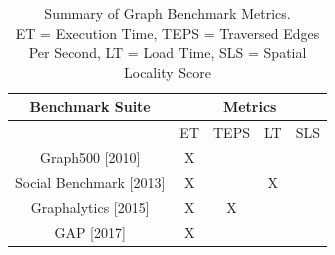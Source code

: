\documentclass[letterpaper, 10pt]{article}
\begin{document}
\begin{multicols}{2}
{        \scriptsize
        \begin{table}[h!]
        \centering
          \begin{tabular}{|c|c|c|c|c|}
            \hline
            {Benchmark Suite} & \multicolumn{4}{|c|}{Metrics} \\
            \hline
                                                      & ET & TEPS & LT & SLS\\
            \hline
             Graph500 [2010]\cite{Murphy2010}         &  X &      &    &     \\
             Social Benchmark [2013]\cite{Angles2013} &  X &      & X  &     \\
             Graphalytics [2015]\cite{Capota2015}     &  X &   X  &    &     \\
             GAP [2017]\cite{Beamer2017}              &  X &      &    &     \\
            \hline
          \end{tabular}
          \caption{Summary of Graph Benchmark Metrics.\\ ET = Execution Time, TEPS = Traversed Edges Per Second, LT = Load Time, SLS = Spatial Locality Score}
          \label{table:graphMetrics}
        \end{table}
        \normalsize

}
\end{multicols}
\end{document}
